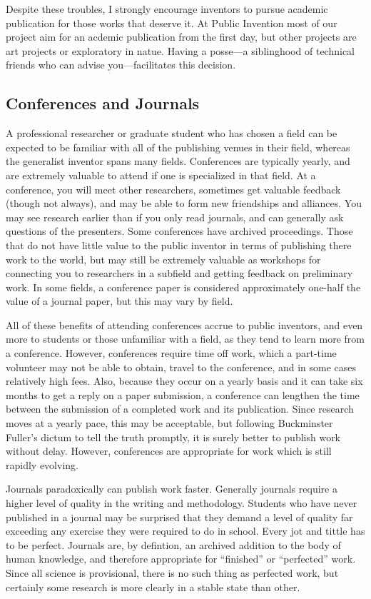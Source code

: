 \documentclass[
	fontsize=10pt, %
	twoside=false, %
	secnumdepth=1, %
]{kaobook}
\begin{document}
Despite these troubles, I strongly encourage inventors to pursue
academic publication for those works that deserve it. At Public Invention
most of our project aim for an acdemic publication from the first day,
but other projects are art projects or exploratory in natue.
Having a posse---a siblinghood of technical friends who can advise you---facilitates this decision.

\subsection{Conferences and Journals}

A professional researcher or graduate student who has chosen a field can be expected to be familiar
with all of the publishing venues in their field, whereas the generalist inventor spans many fields.
Conferences are typically yearly, and are extremely valuable to attend if one is specialized in that
field. At a conference, you will meet other researchers, sometimes get valuable feedback (though
not always), and may be able to form new friendships and alliances. You may see research earlier
than if you only read journals, and can generally ask questions of the presenters.
Some conferences have archived proceedings. Those that do not have little value
to the public inventor in terms of publishing there work to the world, but may still
be extremely valuable as workshops for connecting you to researchers in a subfield and
getting feedback on preliminary work. In some fields, a conference paper is considered
approximately one-half the value of a journal paper, but this may vary by field.

All of these benefits of attending conferences accrue to public inventors, and even more
to students or those unfamiliar with a field, as they tend to learn more from a conference.
However, conferences require time off work, which a part-time volunteer may not be able to obtain,
travel to the conference, and in some cases relatively high fees. Also, because
they occur on a yearly basis and it can take six months to get a reply on a paper submission,
a conference can lengthen the time between the submission of a completed work and its
publication. Since research moves at a yearly pace, this may be acceptable, but following
Buckminster Fuller's dictum to tell the truth promptly, it is surely better to publish
work without delay. However, conferences are appropriate for work which is still rapidly
evolving.

Journals paradoxically can publish work faster. Generally journals require a higher level
of quality in the writing and methodology. Students who have never published in a journal
may be surprised that they demand a level of quality far exceeding any exercise they
were required to do in school. Every jot and tittle has to be perfect.
Journals are, by defintion, an archived addition to the body of human
knowledge, and therefore appropriate for ``finished'' or ``perfected'' work. Since all
science is provisional, there is no such thing as perfected work, but certainly
some research is more clearly in a stable state than other.
\end{document}
